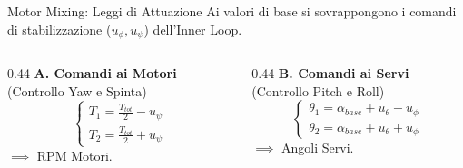 \documentclass[aspectratio=169]{beamer} %
\begin{document}
\begin{frame}{Motor Mixing: Leggi di Attuazione}
    Ai valori di base si sovrappongono i comandi di stabilizzazione ($u_\phi, u_\psi$) dell'Inner Loop.

    \vspace{0.5cm}
    \begin{columns}[c, onlytextwidth] 
        \hfill %
        
        \begin{column}{0.44\textwidth}
            \centering %
            \textbf{A. Comandi ai Motori} \\
            (Controllo Yaw e Spinta)
            \begin{equation}
                \begin{cases}
                    T_{1} = \frac{T_{tot}}{2} - u_{\psi} \\
                    T_{2}  = \frac{T_{tot}}{2} + u_{\psi}
                \end{cases}
            \end{equation}
            $\implies$ RPM Motori.
        \end{column}
        
        \hfill %
        
        \begin{column}{0.44\textwidth}
            \centering
            \textbf{B. Comandi ai Servi} \\
            (Controllo Pitch e Roll)
            \begin{equation}
                \begin{cases}
                    \theta_{1} = \alpha_{base} + u_{\theta} - u_{\phi} \\
                    \theta_{2} = \alpha_{base} + u_{\theta} + u_{\phi}
                \end{cases}
            \end{equation}
            $\implies$ Angoli Servi.
        \end{column}
        
        \hfill %
    \end{columns}
\end{frame}
\end{document}
